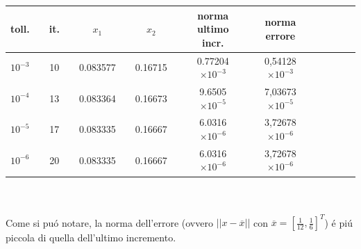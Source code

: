 \begin{tabular}{l*{15}{c}}
 toll. & \vline& it. & \vline& \(x_1\) &\vline& \(x_2\) & \vline& norma ultimo incr. & \vline& norma errore\\
\hline
 \(10^{-3}\) & \vline& 10 & \vline& 0.083577& \vline& 0.16715 &\vline& 0.77204 \(\times 10^{-3}\) & \vline& 0,54128 \(\times 10^{-3}\) \\
 \(10^{-4}\) & \vline& 13 & \vline& 0.083364& \vline& 0.16673 &\vline& 9.6505 \(\times 10^{-5}\) & \vline& 7,03673 \(\times 10^{-5}\) \\
 \(10^{-5}\) & \vline& 17 & \vline& 0.083335& \vline& 0.16667 &\vline& 6.0316 \(\times 10^{-6}\) & \vline& 3,72678 \(\times 10^{-6}\) \\
 \(10^{-6}\) & \vline& 20 & \vline& 0.083335& \vline& 0.16667 &\vline& 6.0316 \(\times 10^{-6}\) & \vline& 3,72678 \(\times 10^{-6}\) \\
\end{tabular} \\
\\
\noindent Come si pu\'o notare, la norma dell'errore (ovvero \(||x - \overline{x}||\) con \(\overline{x} = [\frac{1}{12}, \frac{1}{6}]^T\)) \'e pi\'u piccola di quella dell'ultimo incremento.

